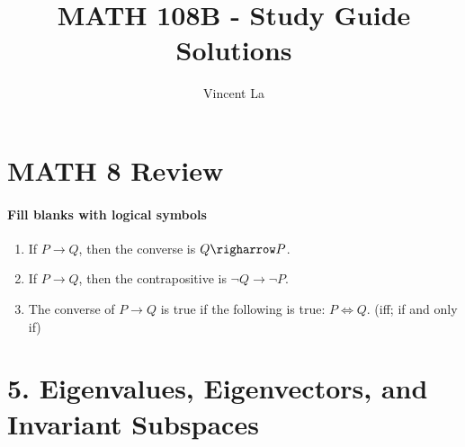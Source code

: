 \documentclass{article}
\title{MATH 108B - Study Guide Solutions}
\author{Vincent La}
\begin{document}
\maketitle

\section*{MATH 8 Review}
\paragraph{Fill blanks with logical symbols}
\begin{enumerate}
    \item If $P \rightarrow Q$, then the converse is $Q \righarrow P$.
    \item If $P \rightarrow Q$, then the contrapositive is $\neg Q \rightarrow \neg P$.
    \item The converse of $P \rightarrow Q$ is true if the following is true: $P \Longleftrightarrow Q$. (iff; if and only if)
\end{enumerate}

\section*{5. Eigenvalues, Eigenvectors, and Invariant Subspaces}
\end{document}
